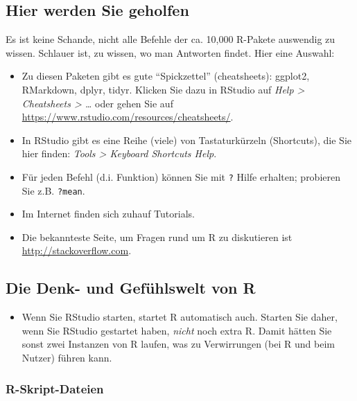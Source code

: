 \documentclass[12pt,ngerman,]{book}
\providecommand{\tightlist}{%
  \setlength{\itemsep}{0pt}\setlength{\parskip}{0pt}}
\begin{document}
\subsection{Hier werden Sie geholfen}\label{hier-werden-sie-geholfen}

Es ist keine Schande, nicht alle Befehle der ca. 10,000 R-Pakete
auswendig zu wissen. Schlauer ist, zu wissen, wo man Antworten findet.
Hier eine Auswahl:

\begin{itemize}
\item
  Zu diesen Paketen gibt es gute ``Spickzettel'' (cheatsheets): ggplot2,
  RMarkdown, dplyr, tidyr. Klicken Sie dazu in RStudio auf \emph{Help
  \textgreater{} Cheatsheets \textgreater{} \ldots{}} oder gehen Sie auf
  \url{https://www.rstudio.com/resources/cheatsheets/}.
\item
  In RStudio gibt es eine Reihe (viele) von Tastaturkürzeln (Shortcuts),
  die Sie hier finden: \emph{Tools \textgreater{} Keyboard Shortcuts
  Help}.
\item
  Für jeden Befehl (d.i. Funktion) können Sie mit \texttt{?} Hilfe
  erhalten; probieren Sie z.B. \texttt{?mean}.
\item
  Im Internet finden sich zuhauf Tutorials.
\item
  Die bekannteste Seite, um Fragen rund um R zu diskutieren ist
  \url{http://stackoverflow.com}.
\end{itemize}

\subsection{Die Denk- und Gefühlswelt von
R}\label{die-denk--und-gefuhlswelt-von-r}

\begin{itemize}
\tightlist
\item
  Wenn Sie RStudio starten, startet R automatisch auch. Starten Sie
  daher, wenn Sie RStudio gestartet haben, \emph{nicht} noch extra R.
  Damit hätten Sie sonst zwei Instanzen von R laufen, was zu
  Verwirrungen (bei R und beim Nutzer) führen kann.
\end{itemize}

\subsubsection{R-Skript-Dateien}\label{r-skript-dateien}
\end{document}
